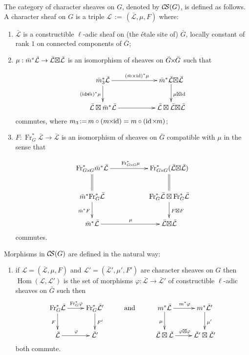 \documentclass[11pt]{amsart}
\makeatletter
\theoremstyle{plain}
\theoremstyle{definition}
\theoremstyle{remark}
\newcommand{\Frob}{{\operatorname{Fr}}}
\DeclareMathOperator{\Hom}{Hom}
\DeclareMathOperator{\id}{id}
\newcommand{\cdef}[1]{{{\color{cyan}#1}\index{#1}}}
\newcommand{\ceq}{{\, :=\, }}
\newcommand{\cs}[1]{{\mathcal{#1}}}
\newcommand{\gcs}[1]{{\mathcal{\bar #1}}}
\newcommand{\CS}{{\mathcal{C\hskip-1.8pt S}}}
\newcommand{\labitem}[2]{%
\def\@itemlabel{\textbf{#1}}
\item
\def\@currentlabel{#1}\label{#2}}
\newcommand{\tighttimes}{\hskip-1pt\times\hskip-1pt}
\newcommand{\tightertimes}{\hskip-3pt\times\hskip-3pt}
\newcommand{\tighterboxtimes}{\hspace{-2pt}\boxtimes\hspace{-2pt}}
\newcommand{\bm}{\bar{m}}
\newcommand{\bG}{\bar{G}}
\newcommand{\bGxG}{\bar{G} \tightertimes \bar{G}}
\newcommand{\GxxG}{G \tighttimes G}
\newcommand{\LxL}{\gcs{L} \tighterboxtimes \gcs{L}}
\makeatother
\begin{document}
The category of character sheaves on $G$, denoted by \cdef{$\CS(G)$},
is defined as follows.  A \cdef{character sheaf} on $G$ is a triple
$\cs{L}\ceq (\gcs{L},\mu,F)$ where:
\begin{enumerate}
\labitem{(CS.0)}{CS.0} $\gcs{L}$ is a constructible $\ell$-adic
  sheaf on (the \'etale site of) $\bG$, locally constant of rank
  $1$ on connected components of $\bG$;

\labitem{(CS.1)}{CS.1} $\mu: \bm^* \gcs{L} \to \LxL$
  is an isomorphism of sheaves on $\bGxG$ such that

  \[
  \xymatrix{
    \bm_3^*\gcs{L} \ar[rr]^{(\bm\times \id)^*\mu} \ar[d]_{(\id\tightertimes \bm)^*\mu}
    &&  \bm^*\LxL \ar[d]^{\mu \boxtimes \id} \\
    \gcs{L} \boxtimes \bm^* \gcs{L} \ar[rr]
    &&  \gcs{L} \boxtimes\LxL\\
  }
  \]
  commutes, where $m_3 \ceq m\circ (m\tightertimes\id) = m\circ (\id\tighttimes m)$;

\labitem{(CS.2)}{CS.2} $F : \Frob_{G}^* \gcs{L} \to \gcs{L}$ is an
  isomorphism of sheaves on $\bG$ compatible with $\mu$ in the sense that

  \[
  \xymatrix{
    \Frob_{\GxxG}^* \bm^* \gcs{L} \ar[rr]^{\Frob_{\GxxG}^*\mu}
    && \Frob_{\GxxG}^*(\LxL)\\
    \ar@{=}[u] \bm^*  \Frob_{G}^* \gcs{L} \ar[d]_{\bm^* F}
    && \ar[d]^{F\boxtimes F} \ar@{=}[u] \Frob_{G}^*\gcs{L}\boxtimes \Frob_{G}^*\gcs{L}\\
    \bm^*\gcs{L} \ar[rr]^{\mu}
    && \LxL\\
  }
  \]
  commutes.
\end{enumerate}
Morphisms in $\CS(G)$ are defined in the natural way:
\begin{enumerate}
\labitem{(CS.3)}{CS.3} if $\cs{L} = (\gcs{L},\mu,F)$ and
  $\cs{L'} = (\gcs{L'},\mu',F')$ are character sheaves on $G$ then
  $\Hom(\cs{L},\cs{L'})$ is the set of morphisms $\varphi : \gcs{L} \to \gcs{L'}$
  of constructible $\ell$-adic sheaves on $\bG$ such then
  \[
  \xymatrix{
  \ar[d]_{F} \Frob_G^* \gcs{L} \ar[r]^{\Frob_G^* \varphi} & \ar[d]^{F'} \Frob_G^* \gcs{L'}
  & \text{and}& \ar[d]_{\mu} m^* \gcs{L} \ar[r]^{m^* \varphi} & \ar[d]^{\mu'} m^* \gcs{L'} \\
  \gcs{L} \ar[r]^{\varphi} & \gcs{L'}
  && \gcs{L}\boxtimes\gcs{L} \ar[r]^{\varphi\boxtimes \varphi} & \gcs{L'} \boxtimes \gcs{L'}\\
  }
  \]
  both commute.
\end{enumerate}
\end{document}
